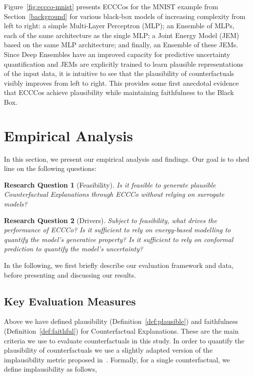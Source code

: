 \documentclass{article}
\newtheorem{question}{Research Question}[section]
\begin{document}
Figure~\ref{fig:eccco-mnist} presents ECCCos for the MNIST example from Section~\ref{background} for various black-box models of increasing complexity from left to right: a simple Multi-Layer Perceptron (MLP); an Ensemble of MLPs, each of the same architecture as the single MLP; a Joint Energy Model (JEM) based on the same MLP architecture; and finally, an Ensemble of these JEMs. Since Deep Ensembles have an improved capacity for predictive uncertainty quantification and JEMs are explicitly trained to learn plausible representations of the input data, it is intuitive to see that the plausibility of counterfactuals visibly improves from left to right. This provides some first anecdotal evidence that ECCCos achieve plausibility while maintaining faithfulness to the Black Box. 

\section{Empirical Analysis}\label{emp}

In this section, we present our empirical analysis and findings. Our goal is to shed line on the following questions:

\begin{question}[Feasibility]\label{rq:feasibility}
  Is it feasible to generate plausible Counterfactual Explanations through ECCCo without relying on surrogate models?
\end{question}

\begin{question}[Drivers]\label{rq:drivers}
  Subject to feasibility, what drives the performance of ECCCo? Is it sufficient to rely on energy-based modelling to quantify the model's generative property? Is it sufficient to rely on conformal prediction to quantify the model's uncertainty?
\end{question}

In the following, we first briefly describe our evaluation framework and data, before presenting and discussing our results.

\subsection{Key Evaluation Measures}\label{evaluation}

Above we have defined plausibility (Definition~\ref{def:plausible}) and faithfulness (Definition~\ref{def:faithful}) for Counterfactual Explanations. These are the main criteria we use to evaluate counterfactuals in this study. In order to quantify the plausibility of counterfactuals we use a slightly adapted version of the implausibility metric proposed in~\citet{guidotti2022counterfactual}. Formally, for a single counterfactual, we define implausibility as follows,
\end{document}
